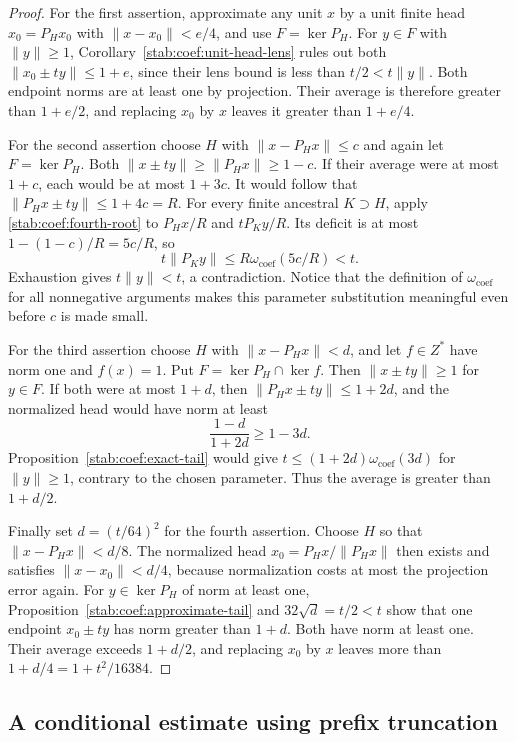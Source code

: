\begin{proof}
For the first assertion, approximate any unit $x$ by a unit finite
head $x_0=P_Hx_0$ with $\|x-x_0\|<e/4$, and use
$F=\ker P_H$. For $y\in F$ with $\|y\|\ge1$,
Corollary~\ref{stab:coef:unit-head-lens} rules out both
$\|x_0\pm ty\|\le1+e$, since their lens bound is less than
$t/2<t\|y\|$. Both endpoint norms are at least one by projection.
Their average is therefore greater than $1+e/2$, and replacing
$x_0$ by $x$ leaves it greater than $1+e/4$.

For the second assertion choose $H$ with
$\|x-P_Hx\|\le c$ and again let $F=\ker P_H$. Both
$\|x\pm ty\|\ge\|P_Hx\|\ge1-c$. If their average were
at most $1+c$, each would be at most $1+3c$. It would follow
that $\|P_Hx\pm ty\|\le1+4c=R$. For every finite ancestral
$K\supset H$, apply \eqref{stab:coef:fourth-root} to
$P_Hx/R$ and $tP_Ky/R$. Its deficit is at most
$1-(1-c)/R=5c/R$, so
\[
 t\|P_Ky\|\le R\omega_{\mathrm{coef}}(5c/R)<t.
\]
Exhaustion gives $t\|y\|<t$, a contradiction. Notice that the
definition of $\omega_{\mathrm{coef}}$ for all nonnegative arguments
makes this parameter substitution meaningful even before $c$ is made small.

For the third assertion choose $H$ with
$\|x-P_Hx\|<d$, and let $f\in Z^*$ have norm one and
$f(x)=1$. Put $F=\ker P_H\cap\ker f$. Then
$\|x\pm ty\|\ge1$ for $y\in F$. If both were at most
$1+d$, then $\|P_Hx\pm ty\|\le1+2d$, and the normalized
head would have norm at least
\[
 \frac{1-d}{1+2d}\ge1-3d.
\]
Proposition~\ref{stab:coef:exact-tail} would give
$t\le(1+2d)\omega_{\mathrm{coef}}(3d)$ for $\|y\|\ge1$, contrary to the
chosen parameter. Thus the average is greater than $1+d/2$.

Finally set $d=(t/64)^2$ for the fourth assertion. Choose $H$
so that $\|x-P_Hx\|<d/8$. The normalized head
$x_0=P_Hx/\|P_Hx\|$ then exists and satisfies
$\|x-x_0\|<d/4$, because normalization costs at most the
projection error again. For $y\in\ker P_H$ of norm at least
one, Proposition~\ref{stab:coef:approximate-tail} and
$32\sqrt d=t/2<t$ show that one endpoint $x_0\pm ty$ has
norm greater than $1+d$. Both have norm at least one. Their
average exceeds $1+d/2$, and replacing $x_0$ by $x$ leaves
more than $1+d/4=1+t^2/16384$.
\end{proof}

\subsection{A conditional estimate using prefix truncation}
\label{stab:coef:conditional}

